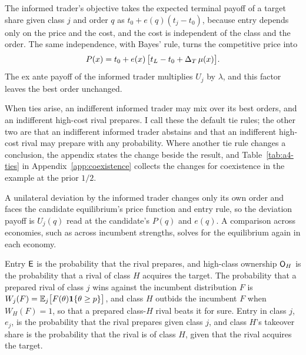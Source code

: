 The informed trader's objective takes the expected terminal payoff of a target share given class \(j\) and order
\(q\) as \(t_0+e(q)(t_j-t_0)\), because entry depends only on the price and the cost, and the cost is
independent of the class and the order. The same independence, with Bayes' rule, turns the competitive price
into
\begin{equation}\label{eq:price}
P(x)=t_0+e(x)\,\bigl[t_L-t_0+\Delta_T\,\mu(x)\bigr].
\end{equation}
The ex ante payoff of the informed trader multiplies \(U_j\) by \(\lambda\), and this factor leaves the best order
unchanged.

When ties arise, an indifferent informed trader may mix over its best orders, and an indifferent high-cost rival
prepares. I call these the default tie rules; the other two are that an indifferent informed trader abstains and that an
indifferent high-cost rival may prepare with any probability. Where another tie rule changes a conclusion, the appendix states the
change beside the result, and Table~\ref{tab:a4-ties} in Appendix~\ref{app:coexistence} collects the changes for
coexistence in the example at the prior \(1/2\).

A unilateral deviation by the informed trader changes only its own order and faces the candidate equilibrium's
price function and entry rule, so the deviation payoff is \(U_j(q)\) read at the candidate's \(P(q)\) and
\(e(q)\). A comparison across economies, such as across incumbent strengths, solves for the equilibrium
again in each economy.

Entry \(\mathsf{E}\) is the probability that the rival prepares, and high-class ownership \(\mathsf{O}_H\) is the
probability that a rival of class \(H\) acquires the target. The probability that a prepared rival
of class \(j\) wins against the incumbent distribution \(F\) is
\(W_j(F)=\mathbb{E}_j\bigl[F(\theta)\mathbf{1}\{\theta\ge p\}\bigr]\), and class \(H\) outbids the incumbent \(F\) when
\(W_H(F)=1\), so that a prepared class-\(H\) rival beats it for sure. Entry in class \(j\), \(e_j\), is the
probability that the rival prepares given class \(j\), and class \(H\)'s takeover share is the probability that
the rival is of class \(H\), given that the rival acquires the target.
